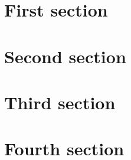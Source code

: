 \documentclass{poster}
\begin{document}
\section{First section}
\lipsum[1]

\section{Second section}
\lipsum[2]

\section{Third section}
\lipsum[1]

\section{Fourth section}
\lipsum[3]
\end{document}
